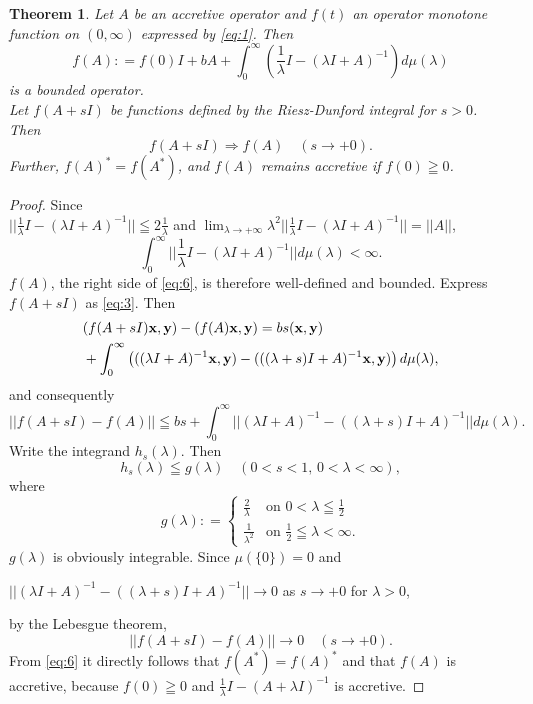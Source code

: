 \documentclass[10pt,a4paper]{amsart}
\newtheorem{theorem}{Theorem}[section]
\begin{document}
\begin{theorem}\label{Th:3-1}
Let $A$ be an accretive operator and  $f(t)$ an operator monotone function
 on $(0, \infty)$ expressed by \eqref{eq:1}. 
Then   
\begin{equation}
 f(A): = f(0)I + b A + \int_0^{\infty} (\frac{1}{\lambda} I - (\lambda I + A)^{-1})
d\mu(\lambda) \label{eq:6}
\end{equation}
 is a bounded operator. \\
Let $f(A+ sI)$ be functions defined by the Riesz-Dunford integral for $s>0$. Then 
$$f(A+ sI)  \Longrightarrow f(A) \quad (s \to +0).$$
Further, $f(A)^* = f(A^*)$, and $f(A)$ remains accretive if $f(0)\geqq 0$. 
\end{theorem}

\begin{proof}
 Since \\
$||\frac{1}{\lambda} I - (\lambda I  + A)^{-1}|| \leqq  2\frac{1}{\lambda} $ and $\lim_{\lambda \to + \infty} \lambda^2 ||\frac{1}{\lambda} I - (\lambda I  + A)^{-1}|| = || A||$, 
 $$\int_0^{\infty} ||\frac{1}{\lambda} I - (\lambda I  + A)^{-1}|| d\mu(\lambda)
<\infty.$$
$f(A)$, the right side of \eqref{eq:6}, is therefore well-defined and bounded.  
Express $f(A + sI)$ as \eqref{eq:3}. Then 
\begin{align*}
&( f(A + s I) {\bf x}, {\bf y}) -( f(A) {\bf x}, {\bf y}) = 
 b  s ({\bf x}, {\bf y}) \\ 
&+ \int_0^{\infty} \left(( (\lambda  I + A)^{-1} {\bf x}, {\bf y}) - 
( ((\lambda + s) I + A)^{-1} {\bf x}, {\bf y}) \right)
 d\mu(\lambda),
\end{align*}
and consequently  
$$|| f(A + sI) - f(A)|| \leqq b  s +  \int_0^{\infty} ||(\lambda  I + A)^{-1}   - 
((\lambda + s) I + A)^{-1} || d\mu (\lambda).
$$
Write the integrand $h_s (\lambda)$. Then 
$$ h_s(\lambda) \leqq  g(\lambda) \quad  (0<s<1, \, 0<\lambda <\infty),$$
where 
$$ g(\lambda): =
\begin{cases}
\frac{2}{\lambda}  & \text{on} \,\, 0 <\lambda \leqq \frac{1}{2}\\
\frac{1}{\lambda^2}  & \text{on} \,\, \frac{1}{2}\leqq \lambda <\infty.
\end{cases}
$$
$g(\lambda)$ is obviously integrable. 
Since $\mu(\{0\}) =0$ and 
\begin{center}
$||(\lambda  I + A)^{-1}   - 
((\lambda + s) I + A)^{-1}|| \to 0$ as $s\to + 0$ for $\lambda >0$,
\end{center}
by the Lebesgue theorem,  
$$|| f(A + sI) - f(A)|| \to 0 \quad (s\to +0).$$
 From \eqref{eq:6} it directly follows that $f(A^{*})= f(A)^{*}$ and that 
$f(A)$ is accretive, because $f(0)\geqq 0$ and 
$\frac{1}{\lambda}I - (A + \lambda I)^{-1}$ is accretive.
\end{proof}
\end{document}
